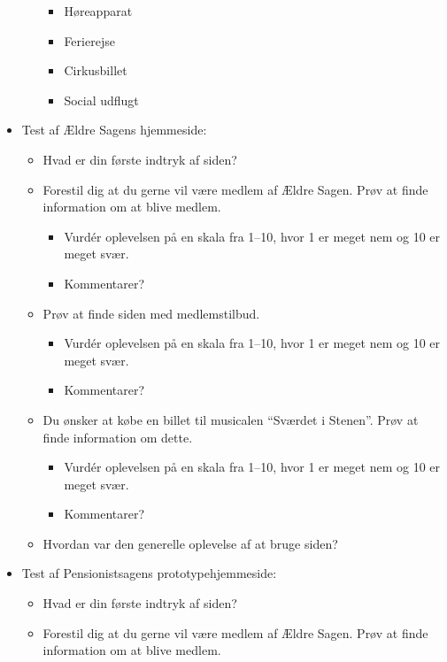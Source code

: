 \begin{appendices}
\begin{itemize}
\begin{itemize}
\begin{itemize}
            \item Høreapparat
            \item Ferierejse
            \item Cirkusbillet
            \item Social udflugt
        \end{itemize}
    \end{itemize}
    \item Test af Ældre Sagens hjemmeside:
    \begin{itemize}
        \item Hvad er din første indtryk af siden?
        \item Forestil dig at du gerne vil være medlem af Ældre Sagen. Prøv at finde information om at blive medlem.
        \begin{itemize}
            \item Vurdér oplevelsen på en skala fra 1--10, hvor 1 er meget nem og 10 er meget svær.
            \item Kommentarer?
        \end{itemize}
        \item Prøv at finde siden med medlemstilbud.
        \begin{itemize}
            \item Vurdér oplevelsen på en skala fra 1--10, hvor 1 er meget nem og 10 er meget svær.
            \item Kommentarer?
        \end{itemize}
        \item Du ønsker at købe en billet til musicalen ``Sværdet i Stenen''. Prøv at finde information om dette.
        \begin{itemize}
            \item Vurdér oplevelsen på en skala fra 1--10, hvor 1 er meget nem og 10 er meget svær.
            \item Kommentarer?
        \end{itemize}
        \item Hvordan var den generelle oplevelse af at bruge siden?
    \end{itemize}
    \item Test af Pensionistsagens prototypehjemmeside:
    \begin{itemize}
        \item Hvad er din første indtryk af siden?
        \item Forestil dig at du gerne vil være medlem af Ældre Sagen. Prøv at finde information om at blive medlem.

\end{itemize}
\end{itemize}
\end{appendices}

